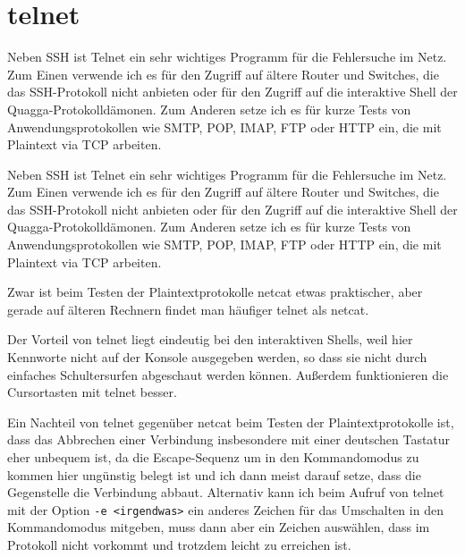 \section{telnet}
\label{sec:netz-werkzeuge-telnet}
\begin{abstractsec}
  Neben SSH ist Telnet ein sehr wichtiges Programm für die Fehlersuche im
  Netz. Zum Einen verwende ich es für den Zugriff auf ältere Router und
  Switches, die das SSH-Protokoll nicht anbieten oder für den Zugriff auf die
  interaktive Shell der Quagga-Protokolldämonen. Zum Anderen setze ich es für
  kurze Tests von Anwendungsprotokollen wie SMTP, POP, IMAP, FTP oder HTTP
  ein, die mit Plaintext via TCP arbeiten.
\end{abstractsec}
\begin{normaltext}
  Neben SSH ist Telnet ein sehr wichtiges Programm für die Fehlersuche im
  Netz. Zum Einen verwende ich es für den Zugriff auf ältere Router und
  Switches, die das SSH-Protokoll nicht anbieten oder für den Zugriff auf die
  interaktive Shell der Quagga-Protokolldämonen. Zum Anderen setze ich es für
  kurze Tests von Anwendungsprotokollen wie SMTP, POP, IMAP, FTP oder HTTP
  ein, die mit Plaintext via TCP arbeiten.

  Zwar ist beim Testen der Plaintextprotokolle netcat etwas praktischer, aber
  gerade auf älteren Rechnern findet man häufiger telnet als netcat.

  Der Vorteil von telnet liegt eindeutig bei den interaktiven Shells, weil
  hier Kennworte nicht auf der Konsole ausgegeben werden, so dass sie nicht
  durch einfaches Schultersurfen abgeschaut werden können. Außerdem
  funktionieren die Cursortasten mit telnet besser.

  Ein Nachteil von telnet gegenüber netcat beim Testen der Plaintextprotokolle
  ist, dass das Abbrechen einer Verbindung insbesondere mit einer deutschen
  Tastatur eher unbequem ist, da die Escape-Sequenz um in den Kommandomodus zu
  kommen hier ungünstig belegt ist und ich dann meist darauf setze, dass die
  Gegenstelle die Verbindung abbaut. Alternativ kann ich beim Aufruf von
  telnet mit der Option \verb?-e <irgendwas>? ein anderes Zeichen für das
  Umschalten in den Kommandomodus mitgeben, muss dann aber ein Zeichen
  auswählen, dass im Protokoll nicht vorkommt und trotzdem leicht zu erreichen
  ist.
\end{normaltext}

